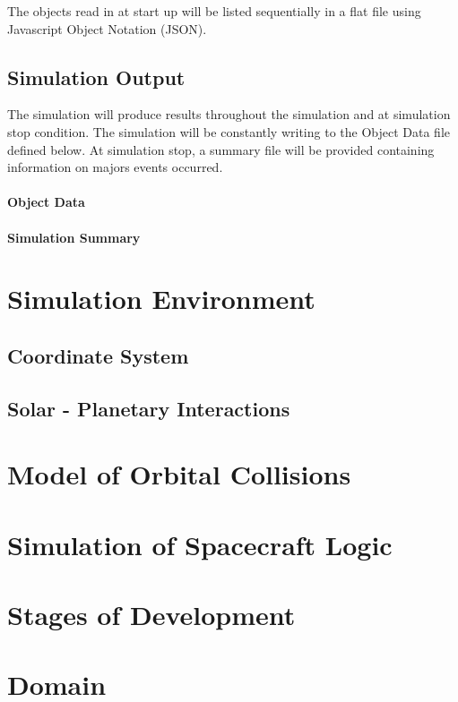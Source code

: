 \documentclass{article}
\begin{document}
  The objects read in at start up will be listed sequentially in a flat file using Javascript Object Notation (JSON).
  
  \subsection{Simulation Output}
  
	The simulation will produce results throughout the simulation and at simulation stop condition. The simulation will be constantly writing to the Object Data file defined below. At simulation stop, a summary file will be provided containing information on majors events occurred. 
  
  \paragraph{Object Data}
  
  
  \paragraph{Simulation Summary}
  
  \section{Simulation Environment}  
  
  \subsection{Coordinate System}
  
  \subsection{Solar - Planetary Interactions}
   
  \section{Model of Orbital Collisions}
  
  \section{Simulation of Spacecraft Logic}
  
  \section{Stages of Development}
  
  \section{Domain}
  
  
\end{document}
